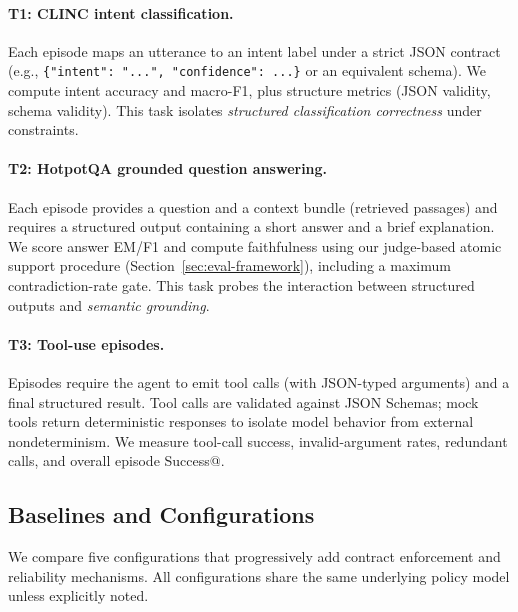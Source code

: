 \paragraph{T1: CLINC intent classification.}
Each episode maps an utterance to an intent label under a strict JSON contract (e.g., \texttt{\{"intent": "...", "confidence": ...\}} or an equivalent schema).
We compute intent accuracy and macro-F1, plus structure metrics (JSON validity, schema validity).
This task isolates \emph{structured classification correctness} under constraints.

\paragraph{T2: HotpotQA grounded question answering.}
Each episode provides a question and a context bundle (retrieved passages) and requires a structured output containing a short answer and a brief explanation.
We score answer EM/F1 and compute faithfulness using our judge-based atomic support procedure (Section~\ref{sec:eval-framework}), including a maximum contradiction-rate gate.
This task probes the interaction between structured outputs and \emph{semantic grounding}.

\paragraph{T3: Tool-use episodes.}
Episodes require the agent to emit tool calls (with JSON-typed arguments) and a final structured result.
Tool calls are validated against JSON Schemas; mock tools return deterministic responses to isolate model behavior from external nondeterminism.
We measure tool-call success, invalid-argument rates, redundant calls, and overall episode Success@\slo.

\subsection{Baselines and Configurations}
\label{sec:baselines-configs}

We compare five configurations that progressively add contract enforcement and reliability mechanisms.
All configurations share the same underlying policy model unless explicitly noted.

